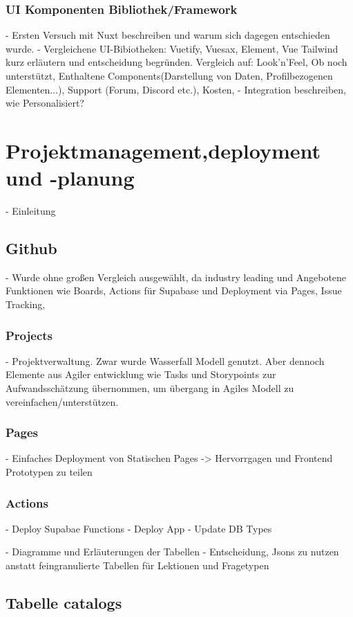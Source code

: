 \subsubsection{UI Komponenten Bibliothek/Framework}
- Ersten Versuch mit Nuxt beschreiben und warum sich dagegen entschieden wurde.
- Vergleichene UI-Bibiotheken: Vuetify, Vuesax, Element, Vue Tailwind kurz erläutern und entscheidung begründen. Vergleich auf: Look'n'Feel, Ob noch unterstützt, Enthaltene Components(Darstellung von Daten, Profilbezogenen Elementen...), Support (Forum, Discord etc.), Kosten, 
- Integration beschreiben, wie Personalisiert?

\section{Projektmanagement,deployment und -planung}
- Einleitung

\subsection{Github}
- Wurde ohne großen Vergleich ausgewählt, da industry leading und Angebotene Funktionen wie Boards, Actions für Supabase und Deployment via Pages, Issue Tracking,

\subsubsection{Projects}
- Projektverwaltung. Zwar wurde Wasserfall Modell genutzt. Aber dennoch Elemente aus Agiler entwicklung wie Tasks und Storypoints zur Aufwandsschätzung übernommen, um übergang in Agiles Modell zu vereinfachen/unterstützen.

\subsubsection{Pages}
- Einfaches Deployment von Statischen Pages -> Hervorrgagen und Frontend Prototypen zu teilen

\subsubsection{Actions}
- Deploy Supabae Functions
- Deploy App
- Update DB Types

- Diagramme und Erläuterungen der Tabellen
- Entscheidung, Jsons zu nutzen anstatt feingranulierte Tabellen für Lektionen und Fragetypen

\subsection{Tabelle catalogs}
